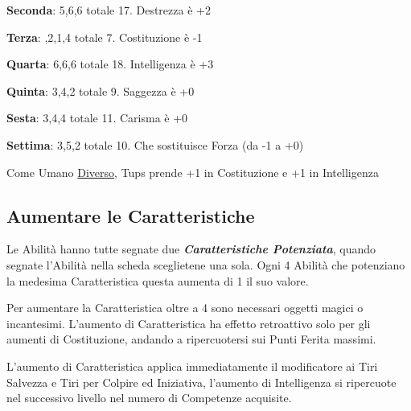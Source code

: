 \begin{multicols}{2}
\begin{changemargin}{0.3cm}{0.3cm}
\begin{tcolorbox}[title = Tiriamo le Caratteristiche di Tups]
		\textbf{Seconda}: 5,6,6 totale 17. Destrezza è +2
		
		\textbf{Terza}: ,2,1,4 totale 7. Costituzione è -1
		
		\textbf{Quarta}: 6,6,6 totale 18. Intelligenza è +3
		
		\textbf{Quinta}: 3,4,2 totale 9. Saggezza è +0
		
		\textbf{Sesta}: 3,4,4 totale 11. Carisma è +0
		
		\textbf{Settima}: 3,5,2 totale 10. Che sostituisce Forza (da -1 a +0)
		
		Come Umano \hyperlink{diverso}{Diverso}, Tups prende +1 in Costituzione e +1 in Intelligenza
		
\end{tcolorbox}\end{changemargin}


\subsection{Aumentare le Caratteristiche}\label{aumentarelecaratteristiche}\hypertarget{aumentarelecaratteristiche}{}

Le Abilità hanno tutte segnate due \emph{\textbf{Caratteristiche Potenziata}}, quando segnate l'Abilità nella scheda sceglietene una sola. Ogni 4 Abilità che potenziano la medesima Caratteristica questa aumenta di 1 il suo valore.

Per aumentare la Caratteristica oltre a 4 sono necessari oggetti magici o incantesimi. L'aumento di Caratteristica ha effetto retroattivo solo per gli aumenti di Costituzione, andando a ripercuotersi sui Punti Ferita massimi.

L'aumento di Caratteristica applica immediatamente il modificatore ai Tiri Salvezza e Tiri per Colpire ed Iniziativa, l'aumento di Intelligenza si ripercuote nel successivo livello nel numero di Competenze acquisite.




\medskip


\end{multicols}
